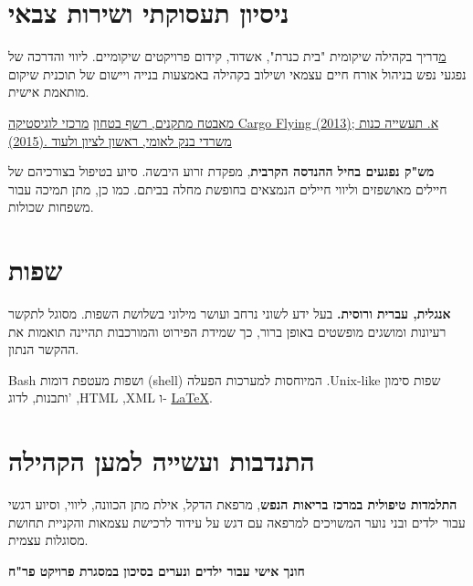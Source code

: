 \section{ניסיון תעסוקתי ושירות צבאי}

{\href{http://www.kidumpro.co.il/}
מדריך בקהילה שיקומית "בית כנרת", אשדוד, קידום פרויקטים שיקומיים.}
{ליווי והדרכה של נפגעי נפש בניהול אורח חיים עצמאי ושילוב בקהילה באמצעות בנייה ויישום של תוכנית שיקום מותאמת אישית.}
{}

{\href{https://loona-il.000webhostapp.com/resume-references/recommendation-letter-security-guard.jpg}{מאבטח מתקנים, רשף בטחון}}
{\href{https://loona-il.000webhostapp.com/resume-references/recommendation-letter-security-guard.jpg}{מרכזי לוגיסטיקה Cargo Flying  א. תעשייה כנות ;(2013) משרדי בנק לאומי, ראשון לציון ולעוד .(2015)}}
{}

{\textbf{מש"ק נפגעים בחיל ההנדסה הקרבית}, מפקדת זרוע היבשה.}
{סיוע בטיפול בצורכיהם של חיילים מאושפזים וליווי חיילים הנמצאים בחופשת מחלה בביתם. כמו כן, מתן תמיכה עבור משפחות שכולות.}
{}

\section{שפות}

{\textbf{אנגלית, עברית ורוסית.} בעל ידע לשוני נרחב ועושר מילוני בשלושת השפות. מסוגל לתקשר רעיונות ומושגים מופשטים באופן ברור, כך שמידת הפירוט והמורכבות תהיינה תואמות את ההקשר הנתון.} 
{}
{}

{Bash
ושפות מעטפת דומות (shell) המיוחסות למערכות הפעלה .Unix-like שפות סימון ותבנות, לדוג' ,HTML ,XML ו-
\setLTR\href{https://github.com/kiril-u/kiril-resume-2021-1/}{\LaTeX}.\unsetLTR  
}
{}
{}
\section{התנדבות ועשייה למען הקהילה}

{\textbf{התלמדות טיפולית במרכז בריאות הנפש}, מרפאת הדקל, אילת}
{מתן הכוונה, ליווי, וסיוע רגשי עבור ילדים ובני נוער המשויכים למרפאה עם דגש על עידוד לרכישת עצמאות והקניית תחושת מסוגלות עצמית.}
{}

{\textbf{חונך אישי עבור ילדים ונערים בסיכון במסגרת פרויקט פר"ח}}
{}
{}		
\unsetRTL